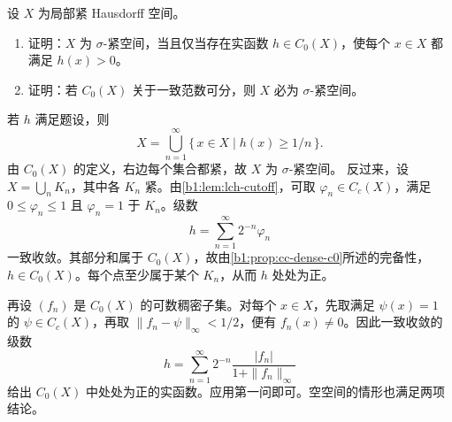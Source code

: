 \begin{exercise}\label{b1:ex:11-positive-c0}
设 \(X\) 为局部紧 Hausdorff 空间。
\begin{enumerate}
\item\label{b1:item:11-positive-c0-sigma}
证明：\(X\) 为 \(\sigma\)-紧空间，当且仅当存在实函数 \(h\in C_0(X)\)，使每个 \(x\in X\) 都满足 \(h(x)>0\)。
\item\label{b1:item:11-positive-c0-separable}
证明：若 \(C_0(X)\) 关于一致范数可分，则 \(X\) 必为 \(\sigma\)-紧空间。
\end{enumerate}
\end{exercise}
\begin{solution}
若 \(h\) 满足题设，则
\[
 X=\bigcup_{n=1}^{\infty}\{\,x\in X\mid h(x)\ge 1/n\,\}.
\]
由 \(C_0(X)\) 的定义，右边每个集合都紧，故 \(X\) 为 \(\sigma\)-紧空间。
反过来，设 \(X=\bigcup_nK_n\)，其中各 \(K_n\) 紧。由\cref{b1:lem:lch-cutoff}，可取 \(\varphi_n\in C_c(X)\)，满足 \(0\le\varphi_n\le1\) 且 \(\varphi_n=1\) 于 \(K_n\)。级数
\[
 h=\sum_{n=1}^{\infty}2^{-n}\varphi_n
\]
一致收敛。其部分和属于 \(C_0(X)\)，故由\cref{b1:prop:cc-dense-c0}所述的完备性，\(h\in C_0(X)\)。每个点至少属于某个 \(K_n\)，从而 \(h\) 处处为正。

再设 \((f_n)\) 是 \(C_0(X)\) 的可数稠密子集。对每个 \(x\in X\)，先取满足 \(\psi(x)=1\) 的 \(\psi\in C_c(X)\)，再取 \(\|f_n-\psi\|_\infty<1/2\)，便有 \(f_n(x)\ne0\)。因此一致收敛的级数
\[
 h=\sum_{n=1}^{\infty}2^{-n}\frac{|f_n|}{1+\|f_n\|_\infty}
\]
给出 \(C_0(X)\) 中处处为正的实函数。应用第一问即可。空空间的情形也满足两项结论。
\end{solution}

